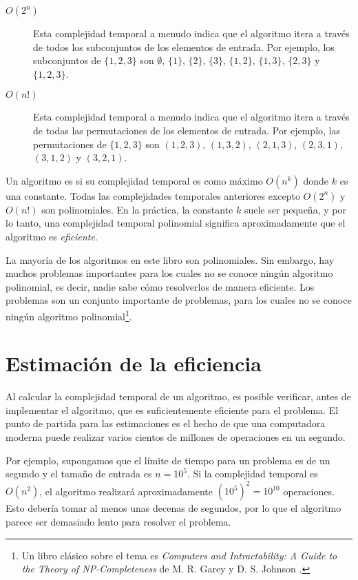 \begin{description}
\item[$O(2^n)$]
Esta complejidad temporal a menudo indica que
el algoritmo itera a través de todos
los subconjuntos de los elementos de entrada.
Por ejemplo, los subconjuntos de $\{1,2,3\}$ son
$\emptyset$, $\{1\}$, $\{2\}$, $\{3\}$, $\{1,2\}$,
$\{1,3\}$, $\{2,3\}$ y $\{1,2,3\}$.

\item[$O(n!)$]
Esta complejidad temporal a menudo indica que
el algoritmo itera a través de todas
las permutaciones de los elementos de entrada.
Por ejemplo, las permutaciones de $\{1,2,3\}$ son
$(1,2,3)$, $(1,3,2)$, $(2,1,3)$, $(2,3,1)$,
$(3,1,2)$ y $(3,2,1)$.

\end{description}

Un algoritmo es 
si su complejidad temporal es como máximo $O(n^k)$
donde $k$ es una constante.
Todas las complejidades temporales anteriores excepto
$O(2^n)$ y $O(n!)$ son polinomiales.
En la práctica, la constante $k$ suele ser pequeña,
y por lo tanto, una complejidad temporal polinomial
significa aproximadamente que el algoritmo es \emph{eficiente}.


La mayoría de los algoritmos en este libro son polinomiales.
Sin embargo, hay muchos problemas importantes para los cuales
no se conoce ningún algoritmo polinomial, es decir,
nadie sabe cómo resolverlos de manera eficiente.
Los problemas  son un conjunto importante
de problemas, para los cuales no se conoce ningún algoritmo
polinomial\footnote{Un libro clásico sobre el tema es
\emph{Computers and Intractability: A Guide to the Theory
of NP-Completeness} de M. R. Garey y D. S. Johnson \cite{gar79}.}.

\section{Estimación de la eficiencia}

Al calcular la complejidad temporal de un algoritmo,
es posible verificar, antes de
implementar el algoritmo, que es
suficientemente eficiente para el problema.
El punto de partida para las estimaciones es el hecho de que
una computadora moderna puede realizar varios cientos de
millones de operaciones en un segundo.

Por ejemplo, supongamos que el límite de tiempo para
un problema es de un segundo y el tamaño de entrada es $n=10^5$.
Si la complejidad temporal es $O(n^2)$,
el algoritmo realizará aproximadamente $(10^5)^2=10^{10}$ operaciones.
Esto debería tomar al menos unas decenas de segundos,
por lo que el algoritmo parece ser demasiado lento para resolver el problema.

